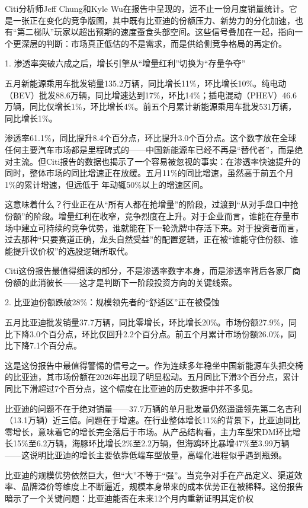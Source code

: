 \documentclass[11pt]{ctexart}
\begin{document}
Citi分析师Jeff Chung和Kyle Wu在报告中呈现的，远不止一份月度销量统计。它是一张正在变化的竞争版图，其中既有比亚迪的份额压力、新势力的分化加速，也有“第二梯队”玩家以超出预期的速度蚕食头部空间。这些信号叠加在一起，指向一个更深层的判断：市场真正低估的不是需求，而是供给侧竞争格局的再定价。

1. 渗透率突破六成之后，增长引擎从“增量红利”切换为“存量争夺”

五月新能源乘用车批发销量135.2万辆，同比增长11\%，环比增长10\%。纯电动（BEV）批发88.6万辆，同比增速达到17\%，环比14\%；插电混动（PHEV）46.6万辆，同比仅增长1\%，环比增长4\%。前五个月累计新能源乘用车批发531万辆，同比增长1\%。

渗透率61.1\%，同比提升8.4个百分点，环比提升3.0个百分点。这个数字放在全球任何主要汽车市场都是里程碑式的——中国新能源车已经不再是“替代者”，而是绝对主流。但Citi报告的数据也揭示了一个容易被忽视的事实：在渗透率快速提升的同时，整体市场的同比增速正在放缓。五月11\%的同比增速，虽然高于前五个月1\%的累计增速，但远低于 年动辄50\%以上的增速区间。

这意味着什么？行业正在从“所有人都在抢增量”的阶段，过渡到“从对手盘口中抢份额”的阶段。增量红利在收窄，竞争烈度在上升。对于企业而言，谁能在存量市场中建立可持续的竞争优势，谁就能在下一轮洗牌中存活下来。对于投资者而言，过去那种“只要赛道正确，龙头自然受益”的配置逻辑，正在被“谁能守住份额、谁能提升议价权”的选股逻辑所取代。

Citi这份报告最值得细读的部分，不是渗透率数字本身，而是渗透率背后各家厂商份额的此消彼长——这才是判断下一阶段投资方向的关键线索。

2. 比亚迪份额跌破28\%：规模领先者的“舒适区”正在被侵蚀

五月比亚迪批发销量37.7万辆，同比零增长，环比增长20\%。市场份额27.9\%，同比下降3.0个百分点，环比仅回升2.2个百分点。前五个月累计市场份额26.0\%，同比下降7.1个百分点。

这是这份报告中最值得警惕的信号之一。作为连续多年稳坐中国新能源车头把交椅的比亚迪，其市场份额在2026年出现了明显松动。五月同比下滑3个百分点，累计同比下滑超过7个百分点，这个幅度在比亚迪的历史数据中并不多见。

比亚迪的问题不在于绝对销量——37.7万辆的单月批发量仍然遥遥领先第二名吉利（13.1万辆）近三倍。问题在于增速。在行业整体增长11\%的背景下，比亚迪同比零增长，意味着它的增长完全落后于市场。从产品结构看，主力车型宋DM环比增长15\%至6.2万辆，海豚环比增长2\%至2.2万辆，但海鸥环比暴增47\%至3.99万辆——这说明比亚迪的增长主要依靠低端车型放量，高端化进程似乎遇到瓶颈。

比亚迪的规模优势依然巨大，但“大”不等于“强”。当竞争对手在产品定义、渠道效率、品牌溢价等维度上不断逼近，规模本身带来的成本优势正在被稀释。这份报告暗示了一个关键问题：比亚迪能否在未来12个月内重新证明其定价权
\end{document}
